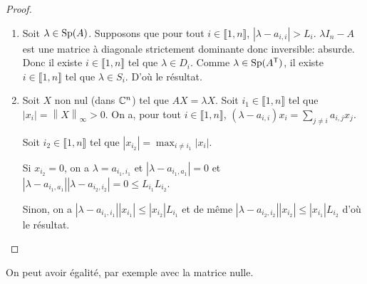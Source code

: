 \documentclass[12pt]{article}
\begin{document}
\begin{proof}
	\phantom{}
	\begin{enumerate}
		\item Soit $\lambda\in\operatorname{Sp}(A)$. Supposons que pour tout $i\in\llbracket1,n\rrbracket$, $\left\lvert\lambda-a_{i,i}\right\rvert >L_{i}$. $\lambda I_{n}-A$ est une matrice à diagonale strictement dominante donc inversible: absurde. Donc il existe $i\in\llbracket1,n\rrbracket$ tel que $\lambda\in D_{i}$. Comme $\lambda\in\operatorname{Sp}(A^{\mathsf{T}})$, il existe $i\in\llbracket1,n\rrbracket$ tel que $\lambda\in S_{i}$. D'où le résultat.
		\item Soit $X$ non nul (dans $\mathbb{C}^{n}$) tel que $AX=\lambda X$. Soit $i_{1}\in\llbracket1,n\rrbracket$ tel que $\left\lvert x_{i}\right\rvert=\left\lVert X\right\rVert_{\infty}>0$. On a, pour tout $i\in\llbracket1,n\rrbracket$, $(\lambda-a_{i,i})x_{i}=\sum_{j\neq i}a_{i,j}x_{j}$. 
		
		Soit $i_{2}\in\llbracket1,n\rrbracket$ tel que $\left\lvert x_{i_{2}}\right\rvert=\max_{i\neq i_{1}}\left\lvert x_{i}\right\rvert$. 
		
		Si $x_{i_{2}}=0$, on a $\lambda=a_{i_{1},i_{1}}$ et $\left\lvert \lambda-a_{i_{1},a_{1}}\right\rvert=0$ et $\left\lvert\lambda-a_{i_{1},a_{1}}\right\rvert\left\lvert\lambda-a_{i_{2},i_{2}}\right\rvert=0\leqslant L_{i_{1}}L_{i_{2}}$.

		Sinon, on a $\left\lvert\lambda-a_{i_{1},i_{1}}\right\rvert\left\lvert x_{i_{1}}\right\rvert\leqslant\left\lvert x_{i_{2}}\right\rvert L_{i_{1}}$ et de même $\left\lvert\lambda-a_{i_{2},i_{2}}\right\rvert\left\lvert x_{i_{2}}\right\rvert\leqslant\left\lvert x_{i_{1}}\right\rvert L_{i_{2}}$ d'où le résultat.
	\end{enumerate}
\end{proof}

\begin{remark}
	On peut avoir égalité, par exemple avec la matrice nulle.
\end{remark}
\end{document}
